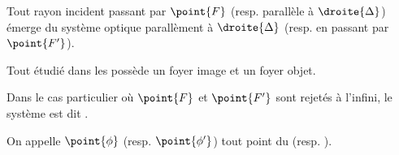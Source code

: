 \begin{definition}
\begin{figure}[H]
\begin{center}
\end{center}
\end{figure}
\end{definition}

\begin{propriete}
Tout rayon incident passant par $\point{F}$ (resp. parallèle à $\droite{\Delta}$) émerge du système optique parallèment à $\droite{\Delta}$ (resp. en passant par $\point{F'}$).
\end{propriete}

\begin{propriete}[admis]
Tout  étudié dans les  possède un foyer image et un foyer objet.
\end{propriete}

\begin{vocabulaire}
Dans le cas particulier où $\point{F}$ et $\point{F'}$ sont rejetés à l'infini, le système est dit .
\end{vocabulaire}

\begin{definition}
On appelle  $\point{\phi}$ (resp.  $\point{\phi'}$) tout point du  (resp. ).
\end{definition}


